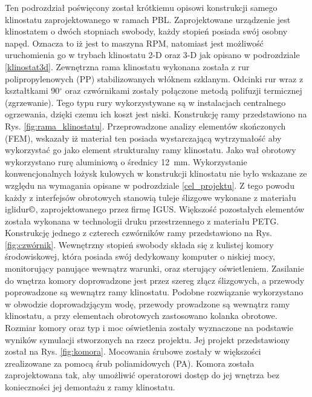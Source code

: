 Ten podrozdział poświęcony został krótkiemu opisowi konstrukcji samego klinostatu zaprojektowanego w ramach PBL. Zaprojektowane urządzenie jest klinostatem o dwóch stopniach swobody, każdy stopień posiada swój osobny napęd. Oznacza to iż jest to maszyna RPM, natomiast jest możliwość uruchomienia go w trybach klinostatu 2-D oraz 3-D jak opisano w podrozdziale \ref{klinostat3d}. Zewnętrzna rama klinostatu wykonana została z rur polipropylenowych (PP) stabilizowanych włóknem szklanym. Odcinki rur wraz z kształtkami 90$^\circ$ oraz czwórnikami zostały połączone metodą polifuzji termicznej (zgrzewanie). Tego typu rury wykorzystywane są w instalacjach centralnego ogrzewania, dzięki czemu ich koszt jest niski. Konstrukcję ramy przedstawiono na Rys. \ref{fig:rama_klinostatu}. Przeprowadzone analizy elementów skończonych (FEM), wskazały iż materiał ten posiada wystarczającą wytrzymałość aby wykorzystać go jako element strukturalny ramy klinostatu. Jako wał obrotowy wykorzystano rurę aluminiową o średnicy \SI{12}{mm}. Wykorzystanie konwencjonalnych łożysk kulowych w konstrukcji klinostatu nie było wskazane ze względu na wymagania opisane w podrozdziale \ref{cel_projektu}. Z tego powodu każdy z interfejsów obrotowych stanowią tuleje ślizgowe wykonane z materiału iglidur$\copyright$, zaprojektowanego przez firmę IGUS. Większość pozostałych elementów została wykonana w technologii druku przestrzennego z materiału PETG. Konstrukcję jednego z czterech czwórników ramy przedstawiono na Rys. \ref{fig:czwórnik}. Wewnętrzny stopień swobody składa się z kulistej komory środowiskowej, która posiada swój dedykowany komputer o niskiej mocy, monitorujący panujące wewnątrz warunki, oraz sterujący oświetleniem. Zasilanie do wnętrza komory doprowadzone jest przez szereg złącz ślizgowych, a przewody poprowadzone są wewnątrz ramy klinostatu. Podobne rozwiązanie wykorzystano w obwodzie doprowadzjącym wodę, przewody prowadzone są wewnątrz ramy klinostatu, a przy elementach obrotowych zastosowano kolanka obrotowe. Rozmiar komory oraz typ i moc oświetlenia zostały wyznaczone na podstawie wyników symulacji stworzonych na rzecz projektu. Jej projekt przedstawiony został na Rys. \ref{fig:komora}. Mocowania śrubowe zostały w większości zrealizowane za pomocą śrub poliamidowych (PA). Komora została zaprojektowana tak, aby umożliwić operatorowi dostęp do jej wnętrza bez konieczności jej demontażu z ramy klinostatu.


